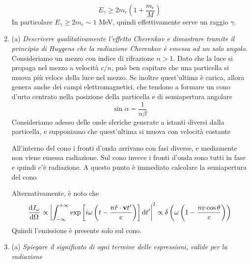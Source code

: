 \documentclass{article}
\renewcommand{\a}{(a)}
\renewcommand{\t}[1]{\textit{ #1}}
\renewcommand{\vec}[1]{\mathbf{#1}}
\begin{document}
\begin{enumerate}
	\[E_\gamma\geq2m_e\left(1+\frac{m_e}{M}\right)\]
	In particolare $E_\gamma\geq 2m_e\sim1$ MeV, quindi effettivamente serve un raggio $\gamma$.
	\item\a\t{Descrivere qualitativamente l’effetto Cherenkov e dimostrare tramite il principio
		di Huygens che la radiazione Cherenkov è emessa ad un solo angolo.} Consideriamo un mezzo con indice di rifrazione $n>1$. Dato che la luce si propaga nel mezzo a velocità $c/n$, può ben capitare che una particella si muova più veloce della luce nel mezzo. Se inoltre quest'ultima è carica, allora genera anche dei campi elettromagnetici, che tendono a formare un cono d'urto centrato nella posizione della particella e di semiapertura angolare
	\[\sin\alpha=\frac{1}{n\beta}\]
	Consideriamo adesso delle onde sferiche generate a istanti diversi dalla particella, e supponiamo che quest'ultima si muova con velocità costante
	\begin{center}
	\end{center}
	All'interno del cono i fronti d'onda arrivano con fasi diverse, e mediamente non viene emessa radiazione. Sul cono invece i fronti d'onda sono tutti in fase e quindi c'è radiazione. A questo punto è immediato calcolare la semiapertura del cono
	\begin{center}
	\end{center}
Alternativamente, è noto che
\[\der{I_\omega}{\Omega}\propto\left|\int_{-\infty}^{+\infty}\exp\left[i\omega\left(t-\frac{n\hat{r}\cdot\vec{v}t'}{c}\right)\right]\d t'\right|^2\propto\delta\left(\omega\left(1-\frac{nv\cos\theta}{c}\right)\right)\]
Quindi l'emissione è presente solo sul cono.
	\item\a\t{Spiegare il significato di ogni termine delle espressioni, valide per la radiazione
}
\end{enumerate}
\end{document}
